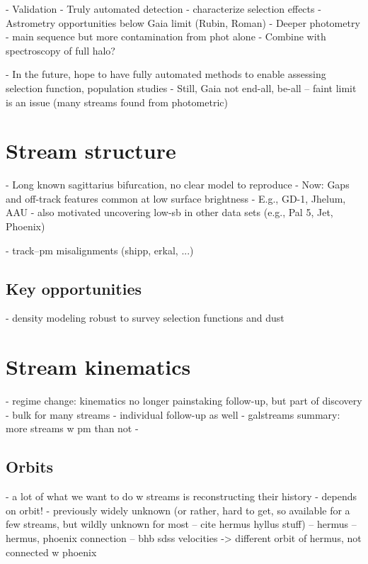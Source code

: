 \documentclass[final,5p,times,twocolumn,authoryear]{elsarticle}
\begin{document}
- Validation
- Truly automated detection - characterize selection effects
- Astrometry opportunities below Gaia limit (Rubin, Roman)
- Deeper photometry - main sequence but more contamination from phot alone
    - Combine with spectroscopy of full halo?

- In the future, hope to have fully automated methods to enable assessing selection function, population studies
- Still, Gaia not end-all, be-all -- faint limit is an issue (many streams found from photometric)


\section{Stream structure}
\label{sec:structure}
- Long known sagittarius bifurcation, no clear model to reproduce
- Now: Gaps and off-track features common at low surface brightness
- E.g., GD-1, Jhelum, AAU
- also motivated uncovering low-sb in other data sets (e.g., Pal 5, Jet, Phoenix)

- track--pm misalignments (shipp, erkal, ...)

\subsection{Key opportunities}
- density modeling robust to survey selection functions and dust



\section{Stream kinematics}
\label{sec:orbits}
- regime change: kinematics no longer painstaking follow-up, but part of discovery
- bulk for many streams \citep{streamfinders}
- individual follow-up as well \citep{others}
- galstreams summary: more streams w pm than not
- 

\subsection{Orbits}
- a lot of what we want to do w streams is reconstructing their history
- depends on orbit!
- previously widely unknown (or rather, hard to get, so available for a few streams, but wildly unknown for most -- cite hermus hyllus stuff)
-- hermus \citep{grillmair:2014}
-- hermus, phoenix connection \citep{gc:2016}
-- bhb sdss velocities -> different orbit of hermus, not connected w phoenix \citep{martin:2018}
\end{document}
